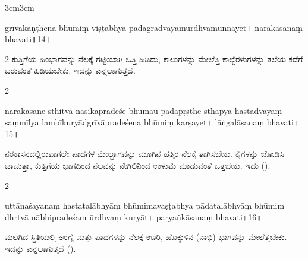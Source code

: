 \begin{adjustwidth}{3cm}{3cm}
\begin{sans}
grīvākaṇṭhena\endnote{°kaṇṭhena~] P, °kaṃṭhakena M.} bhūmiṃ viṣṭabhya pādāgradvayamūrdhvamunnayet\!। narakāsanaṃ bhavati\!॥14\!॥
\end{sans}

\begin{multicols}{2}
{ಕುತ್ತಿಗೆಯ ಹಿಂಭಾಗವನ್ನು ನೆಲಕ್ಕೆ ಗಟ್ಟಿಯಾಗಿ ಒತ್ತಿ ಹಿಡಿದು, ಕಾಲುಗಳನ್ನು ಮೇಲೆತ್ತಿ ಕಾಲ್ಬೆರಳುಗಳನ್ನು ತಲೆಯ ಕಡೆಗೆ ಬರುವಂತೆ ಹಿಡಿಯಬೇಕು. ಇದನ್ನು  ಎನ್ನಲಾಗುತ್ತದೆ.}
\end{multicols}
\end{adjustwidth}

\newpage

\begin{paracol}{2}


\switchcolumn

\begin{sans}
narakāsane sthitvā nāsikāpradeśe bhūmau pādapṛṣṭhe sthāpya hastadvayaṃ saṃmīlya lambīkuryādgrīvāpradeśena bhūmiṃ karṣayet\!। lāṅgalāsanaṃ bhavati\!॥15\!॥
\end{sans}
\vskip 0.5cm

{ನರಕಾಸನದಲ್ಲಿರುವಾಗಲೇ ಪಾದಗಳ ಮೇಲ್ಭಾಗವನ್ನು ಮೂಗಿನ ಹತ್ತಿರ ನೆಲಕ್ಕೆ ತಾಗಿಸಬೇಕು. ಕೈಗಳನ್ನು ಜೋಡಿಸಿ ಚಾಚುತ್ತಾ, ಕುತ್ತಿಗೆಯ ಭಾಗದಿಂದ ನೆಲವನ್ನು ನೇಗಿಲಿನಿಂದ ಉಳುಮೆ ಮಾಡುವಂತೆ ಒತ್ತಬೇಕು. ಇದು   ().}
\end{paracol}
\vskip 0.3cm

\begin{paracol}{2}
\vfill
\begin{sans}
uttānaśayanaṃ hastatalābhyāṃ bhūmimavaṣṭabhya pādatalābhyāṃ bhūmiṃ dhṛtvā nābhipradeśam ūrdhvaṃ kuryāt\!। paryaṅkāsanaṃ bhavati\!॥16\!॥
\end{sans}
\vskip 0.5cm

{ಮಲಗಿದ ಸ್ಥಿತಿಯಲ್ಲಿ ಅಂಗೈ ಮತ್ತು ಪಾದಗಳನ್ನು ನೆಲಕ್ಕೆ ಊರಿ, ಹೊಕ್ಕುಳಿನ (ನಾಭಿ) ಭಾಗವನ್ನು ಮೇಲೆತ್ತಬೇಕು. ಇದನ್ನು  ಎನ್ನಲಾಗುತ್ತದೆ ().}
\vfill
\switchcolumn
{}

\end{paracol}

